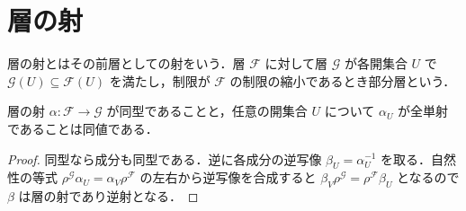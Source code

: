 \section{層の射}
\begin{defn}[層の射と部分層]
層の射とはその前層としての射をいう．層 $\mathcal F$ に対して層 $\mathcal G$ が各開集合 $U$ で $\mathcal G(U)\subseteq\mathcal F(U)$ を満たし，制限が $\mathcal F$ の制限の縮小であるとき部分層という．
\end{defn}
\begin{prop}[層の射の成分同型判定]
層の射 $\alpha:\mathcal F\to\mathcal G$ が同型であることと，任意の開集合 $U$ について $\alpha_U$ が全単射であることは同値である．
\end{prop}
\begin{proof}
同型なら成分も同型である．逆に各成分の逆写像 $\beta_U=\alpha_U^{-1}$ を取る．自然性の等式 $\rho^{\mathcal G}\alpha_U=\alpha_V\rho^{\mathcal F}$ の左右から逆写像を合成すると $\beta_V\rho^{\mathcal G}=\rho^{\mathcal F}\beta_U$ となるので $\beta$ は層の射であり逆射となる．
\end{proof}
